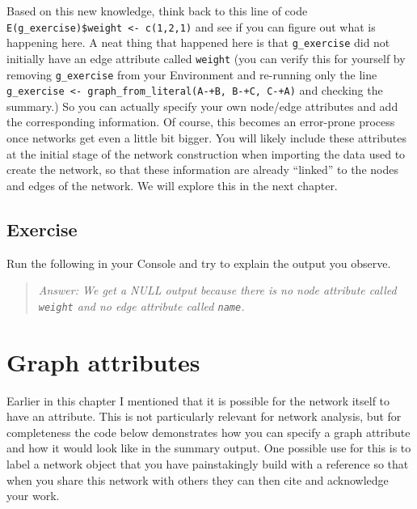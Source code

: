 \documentclass[
]{book}
\newenvironment{Shaded}{\begin{snugshade}}{\end{snugshade}}
\newcommand{\FunctionTok}[1]{\textcolor[rgb]{0.13,0.29,0.53}{\textbf{#1}}}
\newcommand{\NormalTok}[1]{#1}
\newcommand{\SpecialCharTok}[1]{\textcolor[rgb]{0.81,0.36,0.00}{\textbf{#1}}}
\begin{document}
Based on this new knowledge, think back to this line of code \texttt{E(g\_exercise)\$weight\ \textless{}-\ c(1,2,1)} and see if you can figure out what is happening here. A neat thing that happened here is that \texttt{g\_exercise} did not initially have an edge attribute called \texttt{weight} (you can verify this for yourself by removing \texttt{g\_exercise} from your Environment and re-running only the line \texttt{g\_exercise\ \textless{}-\ graph\_from\_literal(A-+B,\ B-+C,\ C-+A)} and checking the summary.) So you can actually specify your own node/edge attributes and add the corresponding information. Of course, this becomes an error-prone process once networks get even a little bit bigger. You will likely include these attributes at the initial stage of the network construction when importing the data used to create the network, so that these information are already ``linked'' to the nodes and edges of the network. We will explore this in the next chapter.

\subsection{Exercise}\label{exercise-3}

Run the following in your Console and try to explain the output you observe.

\begin{Shaded}
\end{Shaded}

\begin{quote}
\emph{Answer: We get a NULL output because there is no node attribute called \texttt{weight} and no edge attribute called \texttt{name}.}
\end{quote}

\section{Graph attributes}\label{graph-attributes}

Earlier in this chapter I mentioned that it is possible for the network itself to have an attribute. This is not particularly relevant for network analysis, but for completeness the code below demonstrates how you can specify a graph attribute and how it would look like in the summary output. One possible use for this is to label a network object that you have painstakingly build with a reference so that when you share this network with others they can then cite and acknowledge your work.
\end{document}
